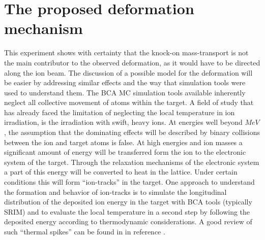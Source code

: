 \section{The proposed deformation mechanism}

This experiment shows with certainty that the knock-on mass-transport is not the main contributor to the observed deformation, as it would have to be directed along the ion beam. The discussion of a possible model for the deformation will be easier by addressing similar effects and the way that simulation tools were used to understand them. The BCA MC simulation tools available inherently neglect all collective movement of atoms within the target. A field of study that has already faced the limitation of neglecting the local temperature in ion irradiation, is the irradiation with swift, heavy ions. At energies well beyond $MeV$, the assumption that the dominating effects will be described by binary collisions between the ion and target atoms is false. At high energies and ion masses a significant amount of energy will be transferred form the ion to the electronic system of the target. Through the relaxation mechanisms of the electronic system a part of this energy will be converted to heat in the lattice. Under certain conditions this will form ``ion-tracks'' in the target. One approach to understand the formation and behavior of ion-tracks is to simulate the longitudinal distribution of the deposited ion energy in the target with BCA tools (typically SRIM) and to evaluate the local temperature in a second step by following the deposited energy according to thermodynamic considerations. A good review of such ``thermal spikes'' can be found in in reference \cite{wesch_effect_2004}. 

